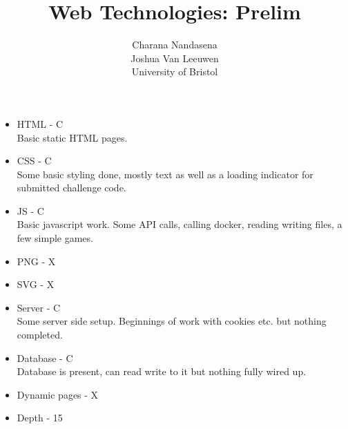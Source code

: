 \documentclass[11pt]{article}
\title{Web Technologies: Prelim}
\author{Charana Nandasena\\Joshua Van Leeuwen\\University of Bristol}
\date{}
\begin{document}
\maketitle

\begin{itemize}
\item{HTML - C\\Basic static HTML pages.}
\item{CSS - C\\Some basic styling done, mostly text as well as a loading
  indicator for submitted challenge code.}
\item{JS - C\\Basic javascript work. Some API calls, calling docker, reading
  writing files, a few simple games.}
\item{PNG - X}
\item{SVG - X}
\item{Server - C\\Some server side setup. Beginnings of work with cookies etc.
  but nothing completed.}
\item{Database - C\\Database is present, can read write to it but nothing fully
  wired up.}
\item{Dynamic pages - X}
\item{Depth - 15}
\end{itemize}


\end{document}
